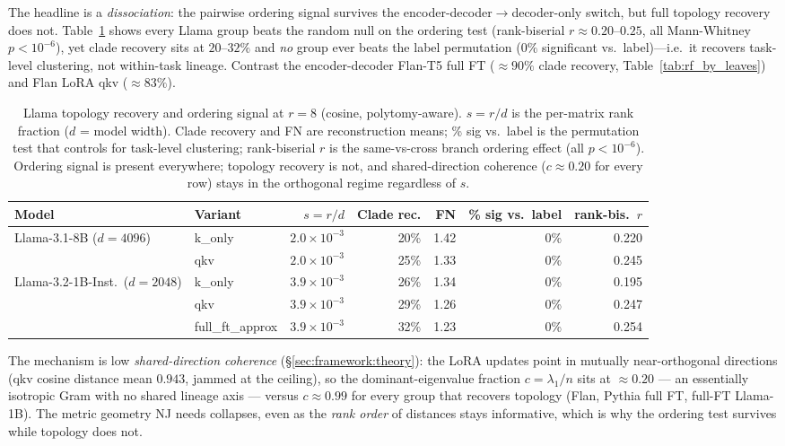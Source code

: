 \documentclass{article}
\theoremstyle{definition}
\theoremstyle{plain}
\begin{document}
The headline is a \emph{dissociation}: the pairwise ordering signal survives the
encoder-decoder$\rightarrow$decoder-only switch, but full topology recovery does not.
Table~\ref{tab:llama_recovery} shows every Llama group beats the random null on the ordering test
(rank-biserial $r\approx0.20$--$0.25$, all Mann-Whitney $p<10^{-6}$), yet clade recovery sits at
$20$--$32\%$ and \emph{no} group ever beats the label permutation ($0\%$ significant
vs.\ label)---i.e.\ it recovers task-level clustering, not within-task lineage. Contrast the
encoder-decoder Flan-T5 full FT ($\approx90\%$ clade recovery, Table~\ref{tab:rf_by_leaves}) and
Flan LoRA qkv ($\approx83\%$).

\begin{table}[h]
\caption{Llama topology recovery and ordering signal at $r=8$ (cosine, polytomy-aware). $s=r/d$ is
  the per-matrix rank fraction ($d$ = model width). Clade recovery and FN are reconstruction means;
  \% sig vs.\ label is the permutation test that controls for task-level clustering; rank-biserial
  $r$ is the same-vs-cross branch ordering effect (all $p<10^{-6}$). Ordering signal is present
  everywhere; topology recovery is not, and shared-direction coherence ($c\approx0.20$ for every row)
  stays in the orthogonal regime regardless of $s$.}
\label{tab:llama_recovery}
\begin{center}
\begin{tabular}{llrrrrr}
\toprule
Model & Variant & $s=r/d$ & Clade rec. & FN & \% sig vs.\ label & rank-bis.\ $r$ \\
\midrule
Llama-3.1-8B ($d{=}4096$)        & k\_only          & $2.0\!\times\!10^{-3}$ & 20\% & 1.42 & 0\% & 0.220 \\
                                 & qkv              & $2.0\!\times\!10^{-3}$ & 25\% & 1.33 & 0\% & 0.245 \\
\midrule
Llama-3.2-1B-Inst.\ ($d{=}2048$) & k\_only          & $3.9\!\times\!10^{-3}$ & 26\% & 1.34 & 0\% & 0.195 \\
                                 & qkv              & $3.9\!\times\!10^{-3}$ & 29\% & 1.26 & 0\% & 0.247 \\
                                 & full\_ft\_approx & $3.9\!\times\!10^{-3}$ & 32\% & 1.23 & 0\% & 0.254 \\
\bottomrule
\end{tabular}
\end{center}
\end{table}

The mechanism is low \emph{shared-direction coherence} (\S\ref{sec:framework:theory}): the LoRA
updates point in mutually near-orthogonal directions (qkv cosine distance mean $0.943$, jammed at the
ceiling), so the dominant-eigenvalue fraction $c=\lambda_1/n$ sits at $\approx0.20$ --- an essentially
isotropic Gram with no shared lineage axis --- versus $c\approx0.99$ for every group that recovers
topology (Flan, Pythia full FT, full-FT Llama-1B). The metric geometry NJ needs collapses, even as the
\emph{rank order} of distances stays informative, which is why the ordering test survives while
topology does not.
\end{document}

